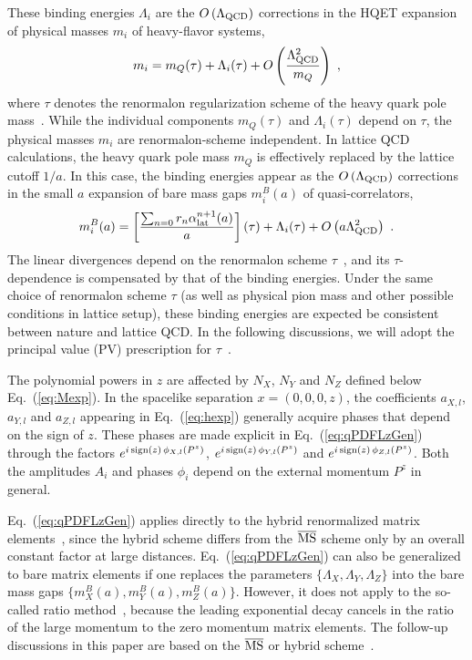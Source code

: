 \documentclass[a4paper,11pt]{article}
\begin{document}
These binding energies $\Lambda_i$ are the $O\left(\Lambda_{\rm QCD}\right)$ corrections in the HQET expansion of physical masses $m_i$ of heavy-flavor systems, 
\begin{align}\label{eq:PhyMass}
m_i = m_Q(\tau) + \Lambda_i(\tau) + O\left(\frac{\Lambda_{\rm QCD}^2}{m_Q}\right) \ ,
\end{align}
where $\tau$ denotes the renormalon regularization scheme of the heavy quark pole mass~\cite{Pineda:2001zq,Hoang:2008yj,Hoang:2009yr,Ayala:2019hkn}. While the individual components $m_Q(\tau)$ and $\Lambda_i(\tau)$ depend on $\tau$, the physical masses $m_i$ are renormalon-scheme independent. In lattice QCD calculations, the heavy quark pole mass $m_Q$ is effectively replaced by the lattice cutoff $1/a$. In this case, the binding energies appear as the $O\left(\Lambda_{\rm QCD}\right)$ corrections in the small $a$ expansion of bare mass gaps $m^{B}_i(a)$ of quasi-correlators,  
\begin{align}\label{eq:BareMass}
m^{B}_i(a) = \left[\frac{\sum_{n=0} r_{n} \alpha_{\rm lat}^{n+1}(a)}{a}\right](\tau) + \Lambda_i(\tau) + O\left(a \Lambda_{\rm QCD}^2\right) \ .    
\end{align}
The linear divergences depend on the renormalon scheme $\tau$~\cite{Braun:2018brg,Zhang:2023bxs}, and its $\tau$-dependence is compensated by that of the binding energies. Under the same choice of renormalon scheme $\tau$ (as well as physical pion mass and other possible conditions in lattice setup), these binding energies are expected be consistent between nature and lattice QCD. In the following discussions, we will adopt the principal value (PV) prescription for $\tau$~\cite{Zhang:2023bxs}.

The polynomial powers in $z$ are affected by $N_X$, $N_Y$ and $N_Z$ defined below Eq.~(\ref{eq:Mexp}). In the spacelike separation $x=(0,0,0,z)$, the coefficients $a_{X,l}$, $a_{Y,l}$ and $a_{Z,l}$ appearing in Eq.~(\ref{eq:hexp}) generally acquire phases that depend on the sign of $z$. These phases are made explicit in Eq.~(\ref{eq:qPDFLzGen}) through the factors $e^{i \, {\rm sign}(z) \, \phi_{X,l}(P^z)}$, $e^{i \, {\rm sign}(z) \, \phi_{Y,l}(P^z)}$ and $e^{i \, {\rm sign}(z) \, \phi_{Z,l}(P^z)}$. Both the amplitudes $A_i$ and phases $\phi_i$ depend on the external momentum $P^z$ in general. 

Eq.~(\ref{eq:qPDFLzGen}) applies directly to the hybrid renormalized matrix elements~\cite{Ji:2020brr}, since the hybrid scheme differs from the $\overline{\rm MS}$ scheme only by an overall constant factor at large distances. Eq.~(\ref{eq:qPDFLzGen}) can also be generalized to bare matrix elements if one replaces the parameters $\{\Lambda_X,\Lambda_Y,\Lambda_Z\}$ into the bare mass gaps $\{m^B_{X}(a),m^B_{Y}(a),m^B_{Z}(a)\}$. However, it does not apply to the so-called ratio method~\cite{Orginos:2017kos}, because the leading exponential decay cancels in the ratio of the large momentum to the zero momentum matrix elements. The follow-up discussions in this paper are based on the $\overline{\rm MS}$ or hybrid scheme~\cite{Ji:2020brr}.  
\end{document}
